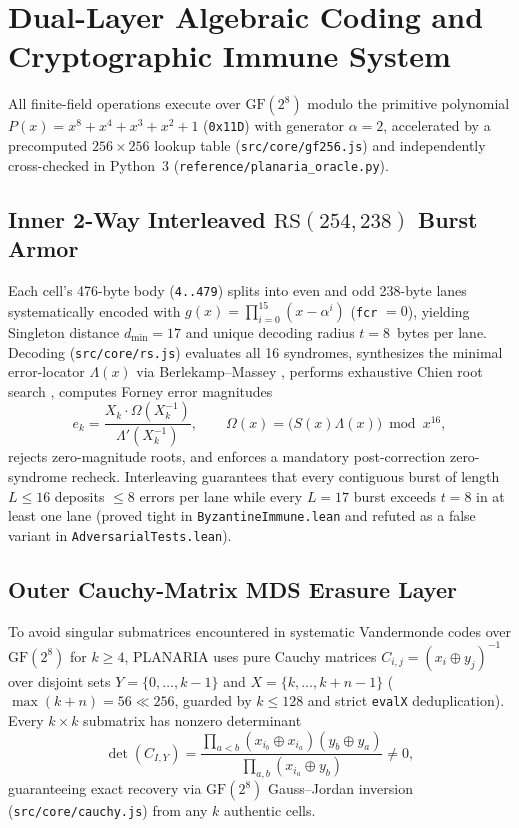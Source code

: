 \documentclass[11pt,letterpaper]{article}
\theoremstyle{remark}
\begin{document}
\section{Dual-Layer Algebraic Coding and Cryptographic Immune System}
\label{sec:coding}

All finite-field operations execute over $\mathrm{GF}(2^8)$ modulo the primitive polynomial $P(x) = x^8 + x^4 + x^3 + x^2 + 1$ (\texttt{0x11D}) with generator $\alpha = 2$, accelerated by a precomputed $256\times 256$ lookup table (\texttt{src/core/gf256.js}) and independently cross-checked in Python~3 (\texttt{reference/planaria\_oracle.py}).

\subsection{Inner 2-Way Interleaved \texorpdfstring{$\mathrm{RS}(254, 238)$}{RS(254, 238)} Burst Armor}
Each cell's 476-byte body (\texttt{4..479}) splits into even and odd 238-byte lanes systematically encoded with $g(x) = \prod_{i=0}^{15}(x - \alpha^i)$ (\texttt{fcr} $= 0$), yielding Singleton distance $d_{\min} = 17$ \cite{singleton1964} and unique decoding radius $t = 8$~bytes per lane. Decoding (\texttt{src/core/rs.js}) evaluates all 16 syndromes, synthesizes the minimal error-locator $\Lambda(x)$ via Berlekamp--Massey \cite{berlekamp1968,massey1969}, performs exhaustive Chien root search \cite{chien1964}, computes Forney error magnitudes \cite{forney1965}
\begin{equation}
  e_k = \frac{X_k \cdot \Omega(X_k^{-1})}{\Lambda'(X_k^{-1})}, \qquad \Omega(x) = \bigl(S(x)\Lambda(x)\bigr)\bmod x^{16},
\end{equation}
rejects zero-magnitude roots, and enforces a mandatory post-correction zero-syndrome recheck. Interleaving guarantees that every contiguous burst of length $L \le 16$ deposits $\le 8$ errors per lane while every $L = 17$ burst exceeds $t = 8$ in at least one lane (proved tight in \texttt{ByzantineImmune.lean} and refuted as a false variant in \texttt{AdversarialTests.lean}).

\subsection{Outer Cauchy-Matrix MDS Erasure Layer}
To avoid singular submatrices encountered in systematic Vandermonde codes over $\mathrm{GF}(2^8)$ for $k \ge 4$, PLANARIA uses pure Cauchy matrices \cite{bloemer1995,plank2006} $C_{i,j} = (x_i \oplus y_j)^{-1}$ over disjoint sets $Y=\{0,\dots,k-1\}$ and $X=\{k,\dots,k+n-1\}$ ($\max(k+n)=56 \ll 256$, guarded by $k \le 128$ and strict \texttt{evalX} deduplication). Every $k \times k$ submatrix has nonzero determinant
\begin{equation}
  \det(C_{I,Y}) = \frac{\prod_{a<b}(x_{i_b}\oplus x_{i_a})(y_b\oplus y_a)}{\prod_{a,b}(x_{i_a}\oplus y_b)} \neq 0,
\end{equation}
guaranteeing exact recovery via $\mathrm{GF}(2^8)$ Gauss--Jordan inversion (\texttt{src/core/cauchy.js}) from any $k$ authentic cells.
\end{document}
